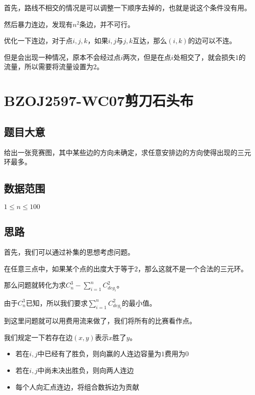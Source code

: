 \documentclass{ctexart}
\numberwithin{equation}{section}
\begin{document}
\begin{flushleft}
  首先，路线不相交的情况是可以调整一下顺序去掉的，也就是说这个条件没有用。

  然后暴力连边，发现有$n^2$条边，并不可行。

  优化一下连边，对于点$i,j,k$，如果$i,j$与$j,k$互达，那么$(i,k)$的边可以不连。

  但是会出现一种情况，原本不会经过点$i$两次，但是在点$i$处相交了，就会损失$1$的流量，所以需要将流量设置为$2$。
  
  \newpage

  \section{BZOJ2597-WC07剪刀石头布}
  \subsection{题目大意}
  给出一张竞赛图，其中某些边的方向未确定，求任意安排边的方向使得出现的三元环最多。
  
    
  \subsection{数据范围}
  $1\le n \le 100$
  \subsection{思路}

  首先，我们可以通过补集的思想考虑问题。

  在任意三点中，如果某个点的出度大于等于$2$，那么这就不是一个合法的三元环。

  那么问题就转化为求$C_n^3-\sum\limits_{i=1}^nC_{deg_i}^2$。

  由于$C_n^3$已知，所以我们要求$\sum\limits_{i=1}^nC_{deg_i}^2$的最小值。

  到这里问题就可以用费用流来做了，我们将所有的比赛看作点。

  我们规定一下若存在边$(x,y)$表示$x$胜了$y$。
  
  \begin{itemize}
  \item 若在$i,j$中已经有了胜负，则向赢的人连边容量为$1$费用为$0$
  \item 若在$i,j$中尚未决出胜负，则向两人连边
  \item 每个人向汇点连边，将组合数拆边为贡献
  \end{itemize}
  

\end{flushleft}
\end{document}
